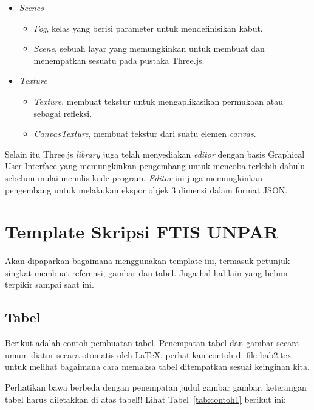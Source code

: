 \begin{itemize}
\item \textit{Scenes}

	\begin{itemize}
	\item {\it Fog}, kelas yang berisi parameter untuk mendefinisikan kabut.
	\item {\it Scene}, sebuah layar yang memungkinkan untuk membuat dan menempatkan sesuatu pada pustaka Three.js. 
	\end{itemize}
	
\item \textit{Texture}
	\begin{itemize}
	\item {\it Texture}, membuat tekstur untuk mengaplikasikan permukaan atau sebagai refleksi.
	\item {\it CanvasTexture}, membuat tekstur dari suatu elemen {\it canvas}.
	\end{itemize}	
	
\end{itemize}

Selain itu Three.js \textit{library} juga telah menyediakan \textit{editor} dengan basis Graphical User Interface yang memungkinkan pengembang untuk mencoba terlebih dahulu sebelum mulai menulis kode program. \textit{Editor} ini juga memungkinkan pengembang untuk melakukan ekspor objek 3 dimensi dalam format JSON.


\section{Template Skripsi FTIS UNPAR}
\label{sec:template}
 
Akan dipaparkan bagaimana menggunakan template ini, termasuk petunjuk singkat membuat referensi, gambar dan tabel.
Juga hal-hal lain yang belum terpikir sampai saat ini. 
 

\subsection{Tabel}  
Berikut adalah contoh pembuatan tabel. 
Penempatan tabel dan gambar secara umum diatur secara otomatis oleh \LaTeX{}, perhatikan contoh di file bab2.tex untuk melihat bagaimana cara memaksa tabel ditempatkan sesuai keinginan kita.

Perhatikan bawa berbeda dengan penempatan judul gambar gambar, keterangan tabel harus diletakkan di atas tabel!!
Lihat Tabel~\ref{tab:contoh1} berikut ini:

